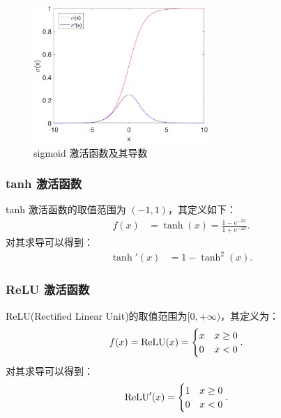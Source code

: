 \begin{figure}[hbt]
	\centering
	\includegraphics[width=6.67cm]{figures/networks/sigmoid}
	\caption{sigmoid 激活函数及其导数}
	\label{fig:sigmoid}
\end{figure}

\subsubsection{ tanh 激活函数}

tanh 激活函数的取值范围为 $(-1,1)$，其定义如下：
\begin{align}
f(x)&=\tanh(x)=\frac{1-e^{-2x}}{1+e^{-2x}}.
\end{align}
对其求导可以得到：
\begin{align}
\tanh'(x)&=1-\tanh^2(x).
\end{align}


\subsubsection{ReLU 激活函数}

ReLU(Rectified Linear Unit)的取值范围为$[0,+\infty)$，其定义为：
\begin{align}
f(x)&={\rm ReLU}(x)=\begin{cases}
      x & x\geq 0 \\
      0& x<0
   \end{cases}.
\end{align}
对其求导可以得到：
\begin{align}
{\rm ReLU}'(x)&=\begin{cases}
      1 & x\geq 0 \\
      0 & x<0
   \end{cases}.
\end{align}


